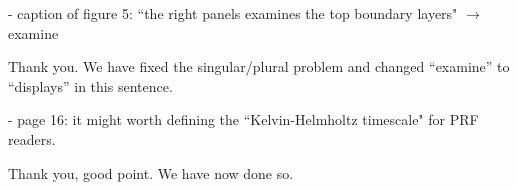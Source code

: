 \documentclass[aps, 11pt, singlecolumn]{revtex4-1} %
\begin{document}
\begin{singlespace}
\begin{myquotation}
- caption of figure 5: ``the right panels examines the top boundary layers" $\rightarrow$ examine
\end{myquotation}
Thank you.
We have fixed the singular/plural problem and changed ``examine'' to ``displays'' in this sentence.

\begin{myquotation}
- page 16: it might worth defining the ``Kelvin-Helmholtz timescale" for PRF readers.
\end{myquotation}
Thank you, good point.
We have now done so.



\end{singlespace}

\end{document}
